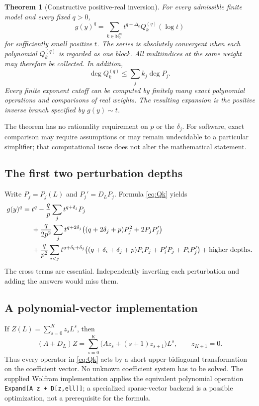 \documentclass[11pt,a4paper]{article}
\newtheorem{theorem}{Theorem}[section]
\theoremstyle{definition}
\theoremstyle{remark}
\newcommand{\NN}{\mathbb N_0}
\newcommand{\code}[1]{\texttt{#1}}
\begin{document}
\begin{theorem}[Constructive positive-real inversion]\label{thm:main}
For every admissible finite model and every fixed $q>0$,
\begin{equation}\label{eq:inverse-main}
 g(y)^q=\sum_{k\in\NN^m}t^{q+\Delta_k}Q_k^{(q)}(\log t)
\end{equation}
for sufficiently small positive $t$. The series is absolutely convergent when
each polynomial $Q_k^{(q)}$ is regarded as one block. All multiindices at the
same weight may therefore be collected. In addition,
\begin{equation}\label{eq:degreebound}
 \deg Q_k^{(q)}\le\sum_j k_j\deg P_j.
\end{equation}
Every finite exponent cutoff can be computed by finitely many exact
polynomial operations and comparisons of real weights. The resulting
expansion is the positive inverse branch specified by $g(y)\sim t$.
\end{theorem}

The theorem has no rationality requirement on $p$ or the $\delta_j$.
For software, exact comparison may require assumptions or may remain
undecidable to a particular simplifier; that computational issue does not
alter the mathematical statement.

\subsection{The first two perturbation depths}

Write $P_j=P_j(L)$ and $P_j'=D_LP_j$. Formula \eqref{eq:Qk} yields
\begin{align}
 g(y)^q={}&t^q-\frac qp\sum_j t^{q+\delta_j}P_j\notag\\
 &+\frac{q}{2p^2}\sum_j t^{q+2\delta_j}
   \bigl((q+2\delta_j+p)P_j^2+2P_jP_j'\bigr)\notag\\
 &+\frac q{p^2}\sum_{i<j}t^{q+\delta_i+\delta_j}
   \bigl((q+\delta_i+\delta_j+p)P_iP_j+P_i'P_j+P_iP_j'\bigr)
   +\text{higher depths}.
 \label{eq:first-two}
\end{align}
The cross terms are essential. Independently inverting each perturbation and
adding the answers would miss them.

\subsection{A polynomial-vector implementation}

If $Z(L)=\sum_{s=0}^{K}z_sL^s$, then
\begin{equation}\label{eq:vector-operator}
 (A+D_L)Z=\sum_{s=0}^{K}\bigl(Az_s+(s+1)z_{s+1}\bigr)L^s,
 \qquad z_{K+1}=0.
\end{equation}
Thus every operator in \eqref{eq:Qk} acts by a short upper-bidiagonal
transformation on the coefficient vector. No unknown coefficient system has
to be solved. The supplied Wolfram implementation applies the equivalent
polynomial operation \code{Expand[A z + D[z,ell]]}; a specialized sparse-vector
backend is a possible optimization, not a prerequisite for the formula.
\end{document}
